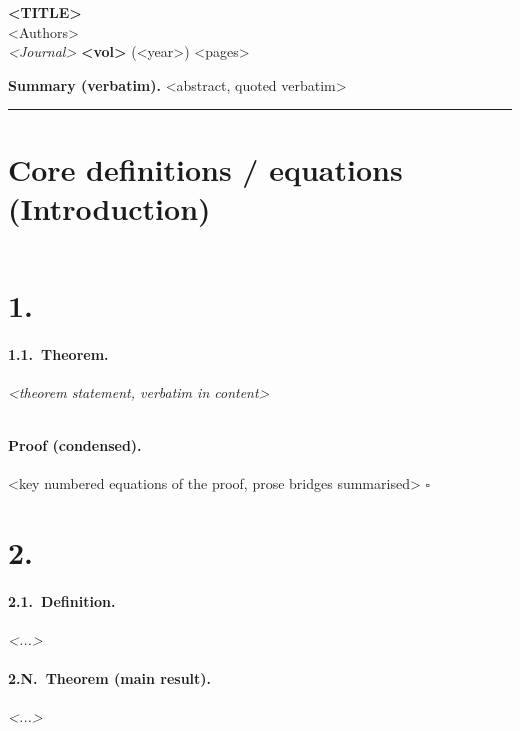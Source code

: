 \documentclass[11pt]{article}
\newenvironment{stmt}{\itshape}{\par}   %
\begin{document}
\begin{center}
{\large\bfseries <TITLE>}\\[4pt]
<Authors>\\[2pt]
{\itshape <Journal>} \textbf{<vol>} (<year>) <pages>
\end{center}

\noindent\textbf{Summary (verbatim).} <abstract, quoted verbatim>

\bigskip\hrule\bigskip

\section*{Core definitions / equations (Introduction)}

\begin{equation}
\end{equation}

\section*{1.\ <section title>}

\paragraph{1.1.\ Theorem.}
\begin{stmt}
<theorem statement, verbatim in content>
\end{stmt}
\begin{equation}
\end{equation}

\paragraph{Proof (condensed).}
<key numbered equations of the proof, prose bridges summarised>
\hfill$\square$

\section*{2.\ <main result section>}

\paragraph{2.1.\ Definition.}
\begin{stmt}<...>\end{stmt}

\paragraph{2.N.\ Theorem (main result).}
\begin{stmt}<...>\end{stmt}
\end{document}
